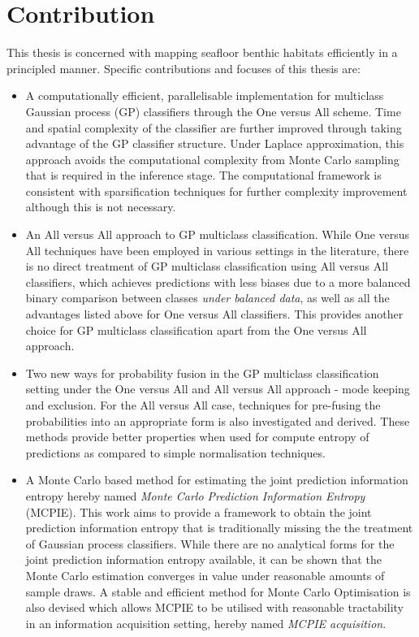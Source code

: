 	\section{Contribution}
	
		This thesis is concerned with mapping seafloor benthic habitats efficiently in a principled manner. Specific contributions and focuses of this thesis are:
		
		\begin{itemize}
		
			\item A computationally efficient, parallelisable implementation for multiclass Gaussian process (GP) classifiers through the One versus All scheme. Time and spatial complexity of the classifier are further improved through taking advantage of the GP classifier structure. Under Laplace approximation, this approach avoids the computational complexity from Monte Carlo sampling that is required in the inference stage. The computational framework is consistent with sparsification techniques for further complexity improvement although this is not necessary.
			
			\item An All versus All approach to GP multiclass classification. While One versus All techniques have been employed in various settings in the literature, there is no direct treatment of GP multiclass classification using All versus All classifiers, which achieves predictions with less biases due to a more balanced binary comparison between classes \textit{under balanced data}, as well as all the advantages listed above for One versus All classifiers. This provides another choice for GP multiclass classification apart from the One versus All approach.

			\item Two new ways for probability fusion in the GP multiclass classification setting under the One versus All and All versus All approach - mode keeping and exclusion. For the All versus All case, techniques for pre-fusing the probabilities into an appropriate form is also investigated and derived. These methods provide better properties when used for compute entropy of predictions as compared to simple normalisation techniques.
			
			\item A Monte Carlo based method for estimating the joint prediction information entropy hereby named \textit{Monte Carlo Prediction Information Entropy} (MCPIE). This work aims to provide a framework to obtain the joint prediction information entropy that is traditionally missing the the treatment of Gaussian process classifiers. While there are no analytical forms for the joint prediction information entropy available, it can be shown that the Monte Carlo estimation converges in value under reasonable amounts of sample draws. A stable and efficient method for Monte Carlo Optimisation is also devised which allows MCPIE to be utilised with reasonable tractability in an information acquisition setting, hereby named \textit{MCPIE acquisition}.
			

\end{itemize}
